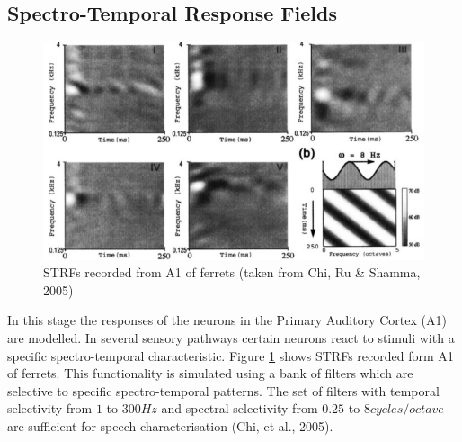 \documentclass{article}
\begin{document}
\subsection{Spectro-Temporal Response Fields}
\begin{figure}
	\includegraphics[width=\linewidth]{img/strfs.jpg}
	\caption{STRFs recorded from A1 of ferrets (taken from Chi, Ru \& Shamma, 2005)}
	\label{fig:strfs}
\end{figure}
In this stage the responses of the neurons in the Primary Auditory Cortex (A1) are modelled. In several sensory pathways certain neurons react to stimuli with a specific spectro-temporal characteristic. Figure \ref{fig:strfs} shows STRFs recorded form A1 of ferrets. This functionality is simulated using a bank of filters which are selective to specific spectro-temporal patterns. The set of filters with temporal selectivity from $1$ to $300Hz$ and spectral selectivity from $0.25$ to $8 cycles/octave$ are sufficient for speech characterisation (Chi, et al., 2005).

\end{document}
